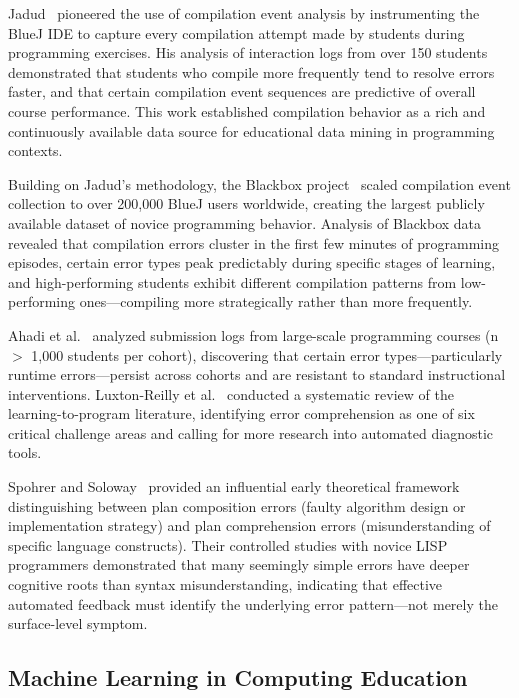 \documentclass[10pt,a4paper]{article}
\begin{document}
Jadud~\cite{jadud2006methods} pioneered the use of compilation event analysis
by instrumenting the BlueJ IDE to capture every compilation attempt made by
students during programming exercises. His analysis of interaction logs from
over 150 students demonstrated that students who compile more frequently tend
to resolve errors faster, and that certain compilation event sequences are
predictive of overall course performance. This work established compilation
behavior as a rich and continuously available data source for educational data
mining in programming contexts.

Building on Jadud's methodology, the Blackbox
project~\cite{bey2022analyzing}
scaled compilation event collection to over 200,000 BlueJ users worldwide,
creating the largest publicly available dataset of novice programming behavior.
Analysis of Blackbox data revealed that compilation errors cluster in the
first few minutes of programming episodes, certain error types peak
predictably during specific stages of learning, and high-performing students
exhibit different compilation patterns from low-performing ones---compiling
more strategically rather than more frequently.

Ahadi et al.~\cite{ahadi2015exploring} analyzed submission logs from
large-scale programming courses (n $>$ 1,000 students per cohort), discovering
that certain error types---particularly runtime errors---persist across cohorts
and are resistant to standard instructional interventions. Luxton-Reilly
et al.~\cite{barbosa2023feedback} conducted a
systematic review of the learning-to-program literature, identifying error
comprehension as one of six critical challenge areas and calling for more
research into automated diagnostic tools.

Spohrer and Soloway~\cite{spohrer1986novice} provided an influential early
theoretical framework distinguishing between plan composition errors (faulty
algorithm design or implementation strategy) and plan comprehension errors
(misunderstanding of specific language constructs). Their controlled studies
with novice LISP programmers demonstrated that many seemingly simple errors
have deeper cognitive roots than syntax misunderstanding, indicating that
effective automated feedback must identify the underlying error pattern---not
merely the surface-level symptom.

\subsection{Machine Learning in Computing Education}
\end{document}
